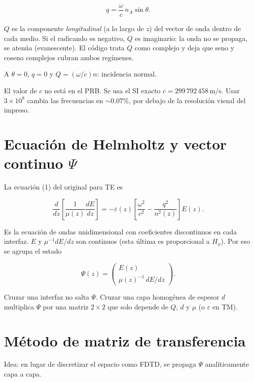 \documentclass[11pt,a4paper]{article}
\begin{document}
\begin{equation}
q=\frac{\omega}{c}\,n_A\sin\theta.
\end{equation}

\(Q\) es la componente \emph{longitudinal} (a lo largo de \(z\)) del vector de
onda dentro de cada medio. Si el radicando es negativo, \(Q\) es imaginario: la
onda no se propaga, se atenúa (evanescente). El código trata \(Q\) como
complejo y deja que seno y coseno complejos cubran ambos regímenes.

A \(\theta=0\), \(q=0\) y \(Q=(\omega/c)n\): incidencia normal.

El valor de \(c\) no está en el PRB. Se usa el SI exacto
\(c=299\,792\,458\,\mathrm{m/s}\). Usar \(3\times 10^8\) cambia las frecuencias
en \(\sim 0.07\%\), por debajo de la resolución visual del impreso.

\section{Ecuación de Helmholtz y vector continuo \(\Psi\)}

La ecuación (1) del original para TE es

\begin{equation}
\frac{d}{dz}\left[\frac{1}{\mu(z)}\frac{dE}{dz}\right]
=-\varepsilon(z)\left[\frac{\omega^2}{c^2}-\frac{q^2}{n^2(z)}\right]E(z).
\end{equation}

Es la ecuación de ondas unidimensional con coeficientes discontinuos en cada
interfaz. \(E\) y \(\mu^{-1}dE/dz\) son continuos (esta última es proporcional
a \(H_x\)).
Por eso se agrupa el estado

\begin{equation}
\Psi(z)=\begin{pmatrix} E(z)\\ \mu(z)^{-1}\,dE/dz \end{pmatrix}.
\end{equation}

Cruzar una interfaz no salta \(\Psi\). Cruzar una capa homogénea de espesor
\(d\) multiplica \(\Psi\) por una matriz \(2\times 2\) que solo depende de
\(Q\), \(d\) y \(\mu\) (o \(\varepsilon\) en TM).

\section{Método de matriz de transferencia}
\label{sec:tmm}

Idea: en lugar de discretizar el espacio como FDTD, se propaga \(\Psi\)
analíticamente capa a capa.
\end{document}

